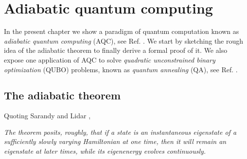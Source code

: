
\chapter{Adiabatic quantum computing} %

\label{Chapter1} %
In the present chapter we show a paradigm of quantum computation known as \textit{adiabatic quantum computing} (AQC), see Ref. \cite{Farhi2000QuantumEvolution}. We start by sketching the rough idea of the adiabatic theorem to finally derive a formal proof of it. We also expose one application of AQC to solve \textit{quadratic unconstrained binary optimization} (QUBO) problems, known as \textit{quantum annealing} (QA), see Ref. \cite{Kadowaki1998QuantumModel}.

\section{The adiabatic theorem}
Quoting Sarandy and Lidar \cite{Sarandy2005AdiabaticSystems},
\begin{displayquote}
\textit{The theorem posits, roughly, that if a state is an instantaneous eigenstate of a sufficiently slowly varying Hamiltonian at one time, then it will remain an eigenstate at later times, while its eigenenergy evolves continuously.}
\end{displayquote}
